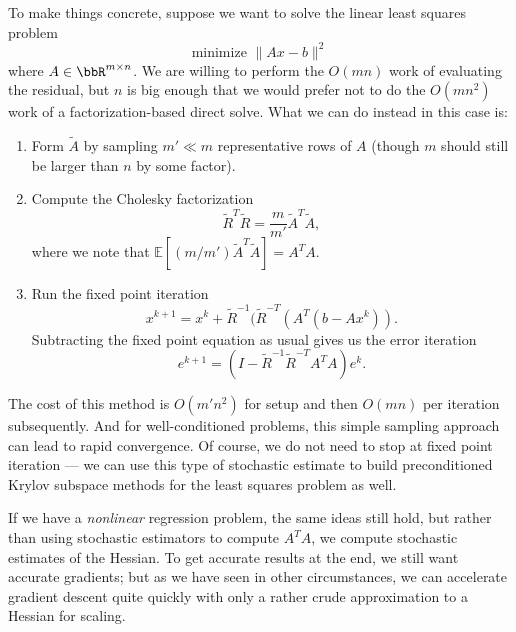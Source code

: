 \documentclass[12pt, leqno]{article} %
\begin{document}
To make things concrete, suppose we want to solve the linear least
squares problem
\[
  \mbox{minimize } \|Ax-b\|^2
\]
where $A \in \bbR^{m \times n}$.  We are willing to perform the
$O(mn)$ work of evaluating the residual, but $n$ is big enough that
we would prefer not to do the $O(mn^2)$ work of a factorization-based
direct solve.  What we can do instead in this case is:
\begin{enumerate}
\item
  Form $\tilde{A}$ by sampling $m' \ll m$ representative rows of $A$
  (though $m$ should still be larger than $n$ by some factor).
\item
  Compute the Cholesky factorization
  \[
    \tilde{R}^T \tilde{R} = \frac{m}{m'} \tilde{A}^T \tilde{A},
  \]
  where we note that $\mathbb{E}[(m/m') \tilde{A}^T \tilde{A}] = A^T A$.
\item
  Run the fixed point iteration
  \[
    x^{k+1} = x^k + \tilde{R}^{-1} (\tilde{R}^{-T} (A^T (b-Ax^k)).
  \]
  Subtracting the fixed point equation as usual gives us the error iteration
  \[
    e^{k+1} = (I-\tilde{R}^{-1} \tilde{R}^{-T} A^T A) e^k.
  \]
\end{enumerate}
The cost of this method is $O(m'n^2)$ for setup and then $O(mn)$ per
iteration subsequently.  And for well-conditioned problems, this
simple sampling approach can lead to rapid convergence.  Of course, we
do not need to stop at fixed point iteration --- we can use this type
of stochastic estimate to build preconditioned Krylov subspace methods
for the least squares problem as well.

If we have a {\em nonlinear} regression problem, the same ideas still
hold, but rather than using stochastic estimators to compute $A^T A$,
we compute stochastic estimates of the Hessian.  To get accurate
results at the end, we still want accurate gradients; but as we have
seen in other circumstances, we can accelerate gradient descent quite
quickly with only a rather crude approximation to a Hessian for scaling.
\end{document}
